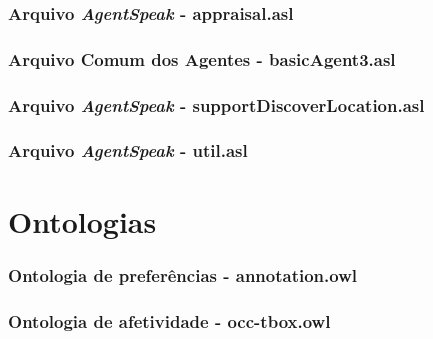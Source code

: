 \subsection*{Arquivo \emph{AgentSpeak} - appraisal.asl}


\subsection*{Arquivo Comum dos Agentes - basicAgent3.asl}


%
%
\subsection*{Arquivo \emph{AgentSpeak} - supportDiscoverLocation.asl}


\subsection*{Arquivo \emph{AgentSpeak} - util.asl}



\chapter{Ontologias}

\subsection*{Ontologia de preferências - annotation.owl}


\subsection*{Ontologia de afetividade - occ-tbox.owl}


%
%
%
%
%

